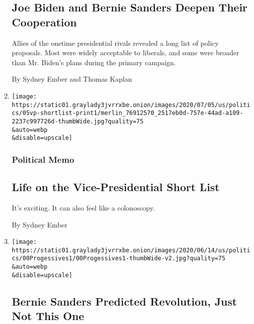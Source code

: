 \begin{enumerate}
  \hypertarget{joe-biden-and-bernie-sanders-deepen-their-cooperation}{%
  \subsection{Joe Biden and Bernie Sanders Deepen Their
  Cooperation}\label{joe-biden-and-bernie-sanders-deepen-their-cooperation}}

  Allies of the onetime presidential rivals revealed a long list of
  policy proposals. Most were widely acceptable to liberals, and some
  were broader than Mr. Biden's plans during the primary campaign.

  By Sydney Ember and Thomas Kaplan
\item
  \href{/2020/07/04/us/politics/biden-vice-president-.html}{}

  \texttt{[image: https://static01.graylady3jvrrxbe.onion/images/2020/07/05/us/politics/05vp-shortlist-print1/merlin\_76912570\_2517eb0d-757e-44ad-a109-2237c997726d-thumbWide.jpg?quality=75\\\&auto=webp\\\&disable=upscale]}

  \hypertarget{political-memo}{%
  \subsubsection{Political Memo}\label{political-memo}}

  \hypertarget{life-on-the-vice-presidential-short-list}{%
  \subsection{Life on the Vice-Presidential Short
  List}\label{life-on-the-vice-presidential-short-list}}

  It's exciting. It can also feel like a colonoscopy.

  By Sydney Ember
\item
  \href{/2020/06/19/us/politics/bernie-sanders-protests.html}{}

  \texttt{[image: https://static01.graylady3jvrrxbe.onion/images/2020/06/14/us/politics/00Progessives1/00Progessives1-thumbWide-v2.jpg?quality=75\\\&auto=webp\\\&disable=upscale]}

  \hypertarget{bernie-sanders-predicted-revolution-just-not-this-one}{%
  \subsection{Bernie Sanders Predicted Revolution, Just Not This
  One}\label{bernie-sanders-predicted-revolution-just-not-this-one}}


\end{enumerate}
